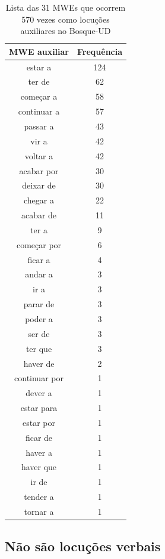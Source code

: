 \documentclass[output=paper,colorlinks,citecolor=brown]{langscibook}
\begin{document}
\begin{table}[]
{\begin{tabular}{|c|c|}
						\textbf{MWE auxiliar} & \textbf{Frequência} \\\hline
							estar a & 124\\\hline
							ter de & 62\\\hline
							começar a & 58\\\hline
							continuar a & 57\\\hline
							passar a & 43\\\hline
							vir a & 42\\\hline
							voltar a & 42\\\hline
							acabar por & 30\\\hline
							deixar de & 30\\\hline
							chegar a & 22\\\hline
							acabar de & 11\\\hline
							ter a & 9\\\hline
							começar por & 6\\\hline
							ficar a & 4\\\hline
							andar a & 3\\\hline
							ir a & 3\\\hline
							parar de & 3\\\hline
							poder a & 3\\\hline
							ser de & 3\\\hline
							ter que & 3\\\hline
							haver de & 2\\\hline
							continuar por & 1\\\hline
							dever a & 1\\\hline
							estar para & 1\\\hline
							estar por & 1\\\hline
							ficar de & 1\\\hline
							haver a & 1\\\hline
							haver que & 1\\\hline
							ir de & 1\\\hline
							tender a & 1\\\hline
							tornar a & 1\\\hline
					\end{tabular}
				}
				\caption{Lista das 31 MWEs que ocorrem 570 vezes como locuções auxiliares no Bosque-UD}
				\label{tab:auxphrasalverb}
			\end{table}

	\subsection{Não são locuções verbais}
\end{document}
